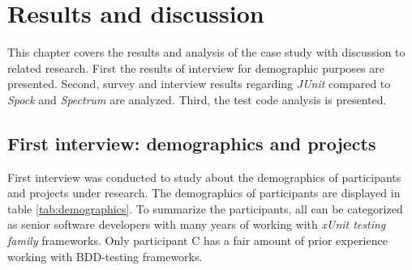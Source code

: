 \chapter{Results and discussion}
\label{chapter:results}

This chapter covers the results and analysis of the case study with discussion to related research.
First the results of interview for demographic purposes are
presented. Second, survey and interview results regarding \textit{JUnit} compared to \textit{Spock} and \textit{Spectrum} are analyzed.  Third, the test
code analysis is presented.

\section{First interview: demographics and projects}
\label{section:demographics}
    First interview was conducted to study about the demographics of participants and projects under research.
    The demographics of participants are displayed in table \ref{tab:demographics}. To summarize the
    participants, all can be categorized as senior software developers with many years of working with \textit{xUnit testing family} frameworks.
    Only participant C has a fair amount of prior experience working with BDD-testing frameworks.
